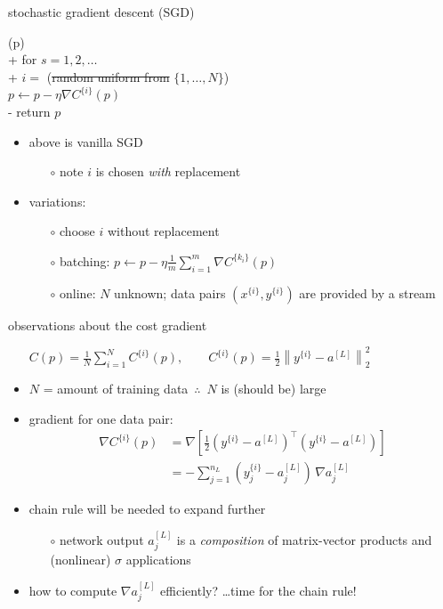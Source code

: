 \documentclass[xcolor={svgnames},
               hyperref={colorlinks,citecolor=DeepPink4,linkcolor=FireBrick,urlcolor=Maroon}]
               {beamer}
\newcommand{\grad}{\nabla}
\begin{document}
\begin{frame}{stochastic gradient descent (SGD)}


\begin{pseudo*}
(p)\text{:} \\+
    for $s = 1,2,\dots$ \\+
        $i=$ (\st{random uniform from} $\{1,\dots,N\}$) \\
        $p \gets p - \eta \grad C^{\{i\}}(p)$ \\-
    return $p$
\end{pseudo*}

\begin{itemize}
\item above is \alert{vanilla} SGD
    \begin{itemize}
    \item[$\circ$] note $i$ is chosen \emph{with} replacement
    \end{itemize}
\item variations:
    \begin{itemize}
    \item[$\circ$] choose $i$ without replacement
    \item[$\circ$] batching: $p \gets p - \eta \frac{1}{m} \sum_{i=1}^m \grad C^{\{k_i\}}(p)$
    \item[$\circ$] \alert{online}: $N$ unknown; data pairs $(x^{\{i\}},y^{\{i\}})$ are provided by a stream
    \end{itemize}
\end{itemize}
\end{frame}


\begin{frame}{observations about the cost gradient}

\begin{itemize}
\item[] \qquad \small $\displaystyle C(p) = \frac{1}{N} \sum_{i=1}^N C^{\{i\}}(p), \qquad C^{\{i\}}(p) = \frac{1}{2} \left\|y^{\{i\}} - a^{[L]}\right\|_2^2$ \normalsize

\medskip
\item $N$ = amount of training data\, $\therefore$\, $N$ is (should be) large
\item gradient for one data pair:
\begin{align*}
\grad C^{\{i\}}(p) &= \grad\left[\frac{1}{2} (y^{\{i\}} - a^{[L]})^\top (y^{\{i\}} - a^{[L]})\right] \\
    &= - \sum_{j=1}^{n_L} (y_j^{\{i\}} - a^{[L]}_j)\, \grad a^{[L]}_j
\end{align*}
\item chain rule will be needed to expand further
    \begin{itemize}
    \item[$\circ$] network output $a_j^{[L]}$ is a \emph{composition} of matrix-vector products and (nonlinear) $\sigma$ applications
    \end{itemize}
\item how to compute $\grad a^{[L]}_j$ efficiently? \dots time for the chain rule!
\end{itemize}
\end{frame}
\end{document}

